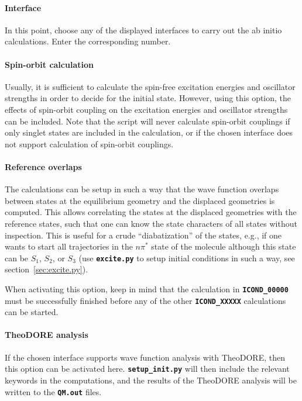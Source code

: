 \documentclass[a4paper,10pt,DIV=15,openany,twoside=false]{scrbook}
\newcommand{\ttt}[1]{\textbf{\texttt{#1}}}
\begin{document}
\paragraph{Interface}

In this point, choose any of the displayed interfaces to carry out the ab initio calculations. Enter the corresponding number. 

\paragraph{Spin-orbit calculation}

Usually, it is sufficient to calculate the spin-free excitation energies and oscillator strengths in order to decide for the initial state. However, using this option, the effects of spin-orbit coupling on the excitation energies and oscillator strengths can be included. Note that the script will never calculate spin-orbit couplings if only singlet states are included in the calculation, or if the chosen interface does not support calculation of spin-orbit couplings.

\paragraph{Reference overlaps}

The calculations can be setup in such a way that the wave function overlaps between states at the equilibrium geometry and the displaced geometries is computed.
This allows correlating the states at the displaced geometries with the reference states, such that one can know the state characters of all states without inspection.
This is useful for a crude ``diabatization'' of the states, e.g., if one wants to start all trajectories in the $n\pi^*$ state of the molecule although this state can be $S_1$, $S_2$, or $S_3$ (use \ttt{excite.py} to setup initial conditions in such a way, see section~\ref{sec:excite.py}).

When activating this option, keep in mind that the calculation in \ttt{ICOND\_00000} must be successfully finished before any of the other \ttt{ICOND\_XXXXX} calculations can be started.

\paragraph{TheoDORE analysis}

If the chosen interface supports wave function analysis with TheoDORE, then this option can be activated here.
\ttt{setup\_init.py} will then include the relevant keywords in the computations, and the results of the TheoDORE analysis will be written to the \ttt{QM.out} files.
\end{document}
